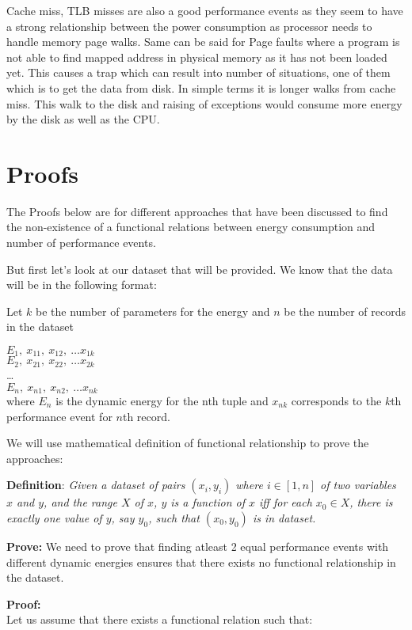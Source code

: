Cache miss, TLB misses are also a good performance events as they seem to have a strong relationship between the power consumption as processor needs to handle memory page walks. Same can be said for Page faults where a program is not able to find mapped address in physical memory as it has not been loaded yet. This causes a trap which can result into number of situations, one of them which is to get the data from disk. In simple terms it is longer walks from cache miss. This walk to the disk and raising of exceptions would consume more energy by the disk as well as the CPU.

\section{Proofs}

The Proofs below are for different approaches that have been discussed to find the non-existence of a functional relations between energy consumption and number of performance events.

But first let's look at our dataset that will be provided.
We know that the data will be in the following format:

Let \(k\) be the number of parameters for the energy and \(n\) be the number of records in the dataset

\(E_1,\ x_{11},\ x_{12},\ \ldots x_{1k}\)\\
\(E_2,\ x_{21},\ x_{22},\ \ldots x_{2k}\)\\
\ldots\\
\(E_n,\ x_{n1},\ x_{n2},\ \ldots x_{nk}\)\\
where \(E_n\) is the dynamic energy for the nth tuple and \(x_{nk}\) corresponds to the \(k\)th performance event for \(n\)th record.

We will use mathematical definition of functional relationship to prove the approaches:

\textbf{Definition}: \textit{Given a dataset of pairs \((x_i, y_i)\) where \(i \in [1, n]\) of two variables \(x\) and \(y\), and the range \(X\) of \(x\), \(y\) is a function of \(x\) iff for each \(x_0 \in X\), there is exactly one value of \(y\), say \(y_0\), such that \((x_0, y_0)\) is in dataset.}~\cite{zembowicz1993testing}

\textbf{Prove:} We need to prove that finding atleast 2 equal performance events with different dynamic energies ensures that there exists no functional relationship in the dataset.

\textbf{Proof:}\\
Let us assume that there exists a functional relation such that:

